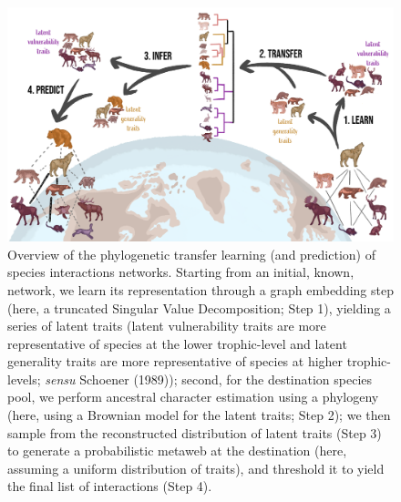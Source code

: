\documentclass[11pt]{article}
\makeatletter
\def\maxwidth{\ifdim\Gin@nat@width>\linewidth\linewidth
\else\Gin@nat@width\fi}
\let\Oldincludegraphics\includegraphics
\renewcommand{\includegraphics}[1]{\Oldincludegraphics[width=\maxwidth]{#1}}
\providecommand{\DIFaddbegin}{\protect\color{blue}} %
\newcommand{\DIFaddincludegraphics}[2][]{{\color{blue}\fbox{\DIFOincludegraphics[#1]{#2}}}} %
\DeclareRobustCommand{\DIFaddbegin}{\DIFOaddbegin \let\includegraphics\DIFaddincludegraphics} %
\makeatother
\begin{document}
\DIFaddbegin 
\begin{figure}
\hypertarget{fig:concept}{%
\centering
\includegraphics{figures/figure-concept.png}
\caption{Overview of the phylogenetic transfer learning (and prediction)
of species interactions networks. Starting from an initial, known,
network, we learn its representation through a graph embedding step
(here, a truncated Singular Value Decomposition; Step 1), yielding a
series of latent traits (latent vulnerability traits are more
representative of species at the lower trophic-level and latent
generality traits are more representative of species at higher
trophic-levels; \emph{sensu} Schoener (1989)); second, for the
destination species pool, we perform ancestral character estimation
using a phylogeny (here, using a Brownian model for the latent traits;
Step 2); we then sample from the reconstructed distribution of latent
traits (Step 3) to generate a probabilistic metaweb at the destination
(here, assuming a uniform distribution of traits), and threshold it to
yield the final list of interactions (Step 4).}\label{fig:concept}
}

\end{figure}
\end{document}
